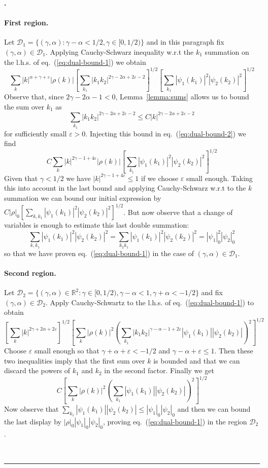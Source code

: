 \documentclass[a4paper,12pt,reqno]{article}
\newcommand{\eps}{\varepsilon}
\newcommand{\RR}{\mathbb{R}}
\newcommand{\DD}{\mathcal{D}}
\newenvironment{proof}[1][Proof]{\textbf{#1.} }{\ \rule{0.5em}{0.5em}}
\begin{document}
\begin{proof}[]
\paragraph{First region.}
Let $\DD_1 = \{(\gamma,\alpha) : \gamma-\alpha < 1/2, \gamma
\in [0,1/2) \}$ and  in this paragraph fix $(\gamma,\alpha) \in \DD_1$.
Applying  Cauchy-Schwarz inequality w.r.t the $k_1$ summation on the
l.h.s. of
eq.~(\ref{eq:dual-bound-1})  we obtain
\begin{equation}
\label{eq:dual-bound-2}
  \sum_{k}  |k|^{\alpha+\gamma+\eps} |\rho(k)|  \left[\sum_{k_1}
    |k_1 k_2|^{2\gamma-2\alpha+2\eps-2}  \right]^{1/2}
  \left[\sum_{k_1 } |\psi_1(k_1)|^2 |\psi_2(k_2)|^2 \right]^{1/2} 
\end{equation}
Observe that, since $2\gamma-2\alpha-1 < 0$, 
Lemma~\ref{lemma:sums} allows us to bound the sum over $k_1$ as
$$
\sum_{k_1}
    |k_1 k_2|^{2\gamma-2\alpha+2\eps-2} \le C |k|^{2\gamma-2\alpha+2\eps-2}
$$
for sufficiently small $\eps > 0$.
Injecting this bound in eq.~(\ref{eq:dual-bound-2}) we find
\begin{equation}
\label{eq:dual-bound-2bis}
 C  \sum_{k}  |k|^{2\gamma-1+4\eps} |\rho(k)|   \left[\sum_{k_1 }
    |\psi_1(k_1)|^2 |\psi_2(k_2)|^2 \right]^{1/2} 
\end{equation}
Given that $\gamma < 1/2$ we have $|k|^{2\gamma-1+4\eps} \le 1$ if we choose $\eps$ small enough. Taking this
into account in the last bound and applying Cauchy-Schwarz w.r.t to
the $k$ summation we can bound our initial expression by
$ C  |\rho|_0   [\sum_{k, k_1 }
    |\psi_1(k_1)|^2 |\psi_2(k_2)|^2 ]^{1/2} $. But now observe that a
    change of variables is enough to estimate this last double
    summation:
$$
\sum_{k, k_1 }
    |\psi_1(k_1)|^2 |\psi_2(k_2)|^2 = \sum_{k_2  k_1 }
    |\psi_1(k_1)|^2 |\psi_2(k_2)|^2 = |\psi_1|_0^2 |\psi_2|_0^2
$$
so that we have proven eq.~(\ref{eq:dual-bound-1}) in the case of
$(\gamma,\alpha) \in \DD_1$.

\paragraph{Second region.}
Let $\DD_2 = \{(\gamma,\alpha)\in\RR^2 : \gamma \in[ 0,1/2),  \gamma-\alpha < 1, \gamma
+\alpha < -1/2 \}$ and fix $(\gamma,\alpha) \in \DD_2$.
Apply Cauchy-Schwartz to the l.h.s. of eq.~(\ref{eq:dual-bound-1}) to obtain
$$
\left[\sum_k |k|^{2\gamma+2\alpha+2\eps}\right]^{1/2}
\left[\sum_k |\rho(k)|^2 \left(\sum_{k_1} 
    |k_1 k_2|^{\gamma-\alpha-1+2\eps} |\psi_1(k_1)|  |\psi_2(k_2)| \right)^2\right]^{1/2}
$$
Choose $\eps$ small enough so that $\gamma+\alpha+\eps < -1/2$ and $\gamma-\alpha+\eps \le 1$. Then these two inequalities imply that the first sum over $k$ is bounded and that we can discard the powers of $k_1$ and $k_2$ in the second factor. Finally we get
$$
C
\left[\sum_k |\rho(k)|^2 \left(\sum_{k_1} |\psi_1(k_1)|  |\psi_2(k_2)| \right)^2\right]^{1/2}
$$
Now observe that $ \sum_{k_1} |\psi_1(k_1)|  |\psi_2(k_2)| \le
|\psi_1|_0 |\psi_2|_0$ and then we can bound the last display by
$
|\rho|_0 |\psi_1|_0 |\psi_2|_0
$, proving eq.~(\ref{eq:dual-bound-1}) in the region $\DD_2$.


\end{proof}
\end{document}
